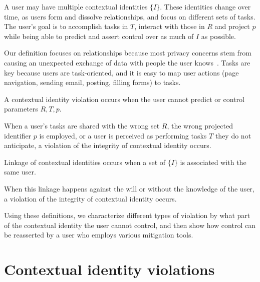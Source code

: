 \documentclass{llncs}
\begin{document}
A user may have multiple contextual identities $\{I\}$. These identities change
over time, as users form and dissolve relationships, and focus on different
sets of tasks. The user's goal is to accomplish tasks in $T$,
interact with those in $R$ and project $p$ while being able to predict and
assert control over as much of $I$ as possible.

Our definition focuses on relationships because most privacy concerns stem
from causing an unexpected exchange of data with people the user
knows~\cite{wang}. Tasks are key because users are task-oriented, and it is
easy to map user actions (page navigation, sending email, posting, filling
forms) to tasks.

\begin{definition}
A contextual identity violation occurs when the user cannot predict or control
parameters $R,T,p$.
\end{definition}
When a user's tasks are shared with the wrong set $R$, the wrong projected
identifier $p$ is employed, or a user is perceived as performing tasks $T$ they
do not anticipate, a violation of the integrity of contextual identity occurs.

\begin{definition}
Linkage of contextual identities occurs when a set of $\{I\}$ is associated
with the same user.
\end{definition}

When this linkage happens against the will or without the knowledge of the
user, a violation of the integrity of contextual identity occurs.

Using these definitions, we characterize different types of violation by what
part of the contextual identity the user cannot control, and then show how
control can be reasserted by a user who employs various mitigation tools.

\section{Contextual identity violations}
\label{sec:examples}
\end{document}
